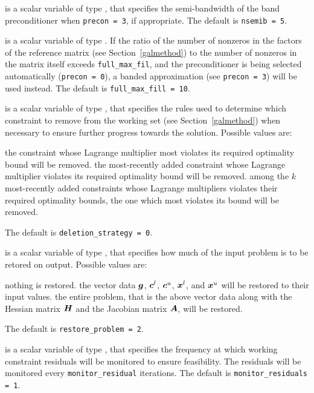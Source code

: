 \begin{description}
 is a scalar variable of type \integer, that specifies
the semi-bandwidth of the band preconditioner when {\tt precon = 3},
if appropriate.
The default is {\tt nsemib = 5}.

 is a scalar variable of type \integer.
If the ratio of the number of nonzeros in the factors
of the reference matrix (see Section~\ref{galmethod}) to the number of
nonzeros in the matrix itself exceeds {\tt full\_max\_fil},
and the preconditioner is being selected
automatically ({\tt precon = 0}), a banded approximation (see {\tt precon = 3})
will be used instead.
The default is {\tt full\_max\_fill = 10}.

 is a scalar variable of type \integer, that
specifies the rules used to determine which constraint to remove
from the working set (see Section~\ref{galmethod}) when necessary to ensure
further progress towards the solution. Possible values are:
\begin{description}
 the constraint whose Lagrange multiplier most violates its
required optimality bound will be removed.
the most-recently added constraint whose Lagrange multiplier violates its
required optimality bound will be removed.
 among the $k$ most-recently added constraints whose
Lagrange multipliers violates their required optimality bounds,
the one which most violates its bound will be removed.
\end{description}
The default is {\tt deletion\_strategy = 0}.

 is a scalar variable of type \integer, that
specifies how much of the input problem is to be retored on output.
Possible values are:
\begin{description}
 nothing is restored.
 the vector data ${\bm{g}}$,
   ${\bm{c}}^{l}$, ${\bm{c}}^{u}$, ${\bm{x}}^{l}$, and ${\bm{x}}^{u}$
   will be restored to their input values.
 the entire problem, that is the above vector data along with
the Hessian matrix ${\bm{H}}$ and the Jacobian matrix ${\bm{A}}$, will be restored.
\end{description}
The default is {\tt restore\_problem = 2}.

 is a scalar variable of type \integer, that
specifies the frequency at which working constraint residuals will be monitored
to ensure feasibility. The  residuals will be monitored every
{\tt monitor\_residu\-al} iterations.
The default is {\tt monitor\_residuals = 1}.


\end{description}
